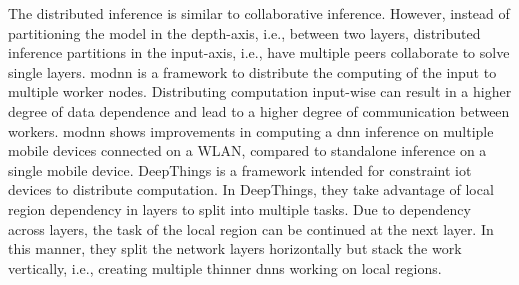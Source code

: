 The distributed inference is similar to collaborative inference. However, instead of partitioning the model in the depth-axis, i.e., between two layers, distributed inference partitions in the input-axis, i.e., have multiple peers collaborate to solve single layers. \gls{modnn} \cite{mao_modnn:_2017} is a framework to distribute the computing of the input to multiple worker nodes. Distributing computation input-wise can result in a higher degree of data dependence and lead to a higher degree of communication between workers. \gls{modnn} shows improvements in computing a \gls{dnn} inference on multiple mobile devices connected on a WLAN, compared to standalone inference on a single mobile device. DeepThings \cite{zhao_deepthings:_2018} is a framework intended for constraint \gls{iot} devices to distribute computation. In DeepThings, they take advantage of local region dependency in layers to split into multiple tasks. Due to dependency across layers, the task of the local region can be continued at the next layer. In this manner, they split the network layers horizontally but stack the work vertically, i.e., creating multiple thinner \gls{dnn}s working on local regions.
